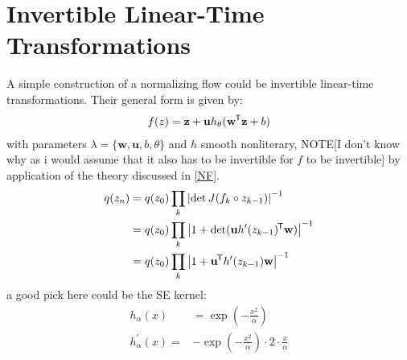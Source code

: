 \section{Invertible Linear-Time Transformations}
A simple construction of a normalizing flow could be invertible linear-time transformations. Their general form is given by:
\begin{align*}
    f(z)=\mathbf{z}+\mathbf{u} h_\theta(\mathbf{w}^{\mkern-1.5mu\mathsf{T}}\mathbf{z}+b)
\end{align*}
with parameters $\lambda=\{\mathbf{w},\mathbf{u},b,\theta\}$ and $h$ smooth nonliterary, NOTE[I don't know why as i would assume that it also has to be invertible for $f$ to be invertible] 
by application of the theory discussed in \cref{NF}.
\begin{align*}
    q(z_n) & =q(z_0)\prod_k\left\lvert\det J(f_k \circ z_{k-1})\right\rvert^{-1}\\
    & = q(z_0)\prod_k\left\lvert1+\det (\mathbf{u}h'(z_{k-1})^{\mkern-1.5mu\mathsf{T}}\mathbf{w})\right\rvert^{-1}\\
    & = q(z_0)\prod_k\left\lvert1+ \mathbf{u}^{\mkern-1.5mu\mathsf{T}} h^\prime(z_{k-1})\mathbf{w}\right\rvert^{-1}
\end{align*}
a good pick here could be the SE kernel:
\begin{align*}
    h_\alpha(x) & =\exp(-\frac{x^2}{\alpha})\\
    h^\prime_\alpha(x)= & -\exp(-\frac{x^2}{\alpha}) \cdot 2 \cdot \frac{x}{\alpha}
\end{align*}

